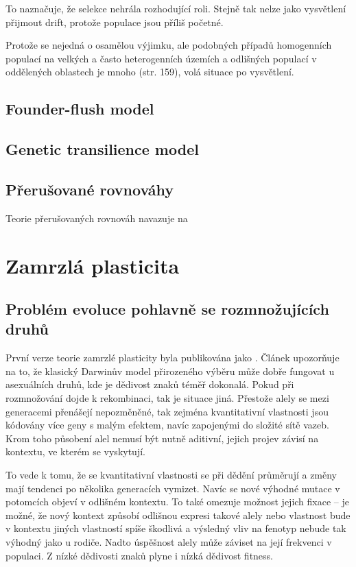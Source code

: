 To naznačuje, že selekce nehrála rozhodující roli. Stejně tak nelze jako vysvětlení přijmout drift, protože populace
jsou příliš početné.

Protože se nejedná o osamělou výjimku, ale podobných případů homogenních populací na velkých a často heterogenních
územích a odlišných populací v oddělených oblastech je mnoho (str. 159), volá situace po vysvětlení.



\subsection{Founder-flush model}

\subsection{Genetic transilience model}

\subsection{Přerušované rovnováhy}

Teorie přerušovaných rovnováh navazuje na

\section{Zamrzlá plasticita}

\subsection{Problém evoluce pohlavně se rozmnožujících druhů}

První verze teorie zamrzlé plasticity byla publikována jako \citet{flegr1998origin}. Článek upozorňuje na to, že
klasický Darwinův model přirozeného výběru může dobře fungovat u asexuálních druhů, kde je dědivost znaků téměř
dokonalá.
Pokud při rozmnožování dojde k rekombinaci, tak je situace jiná. Přestože alely se mezi generacemi přenášejí
nepozměněné, tak zejména kvantitativní vlastnosti jsou kódovány více geny s malým efektem, navíc zapojenými do
složité sítě vazeb. Krom toho působení alel nemusí být nutně aditivní, jejich projev závisí na kontextu,
ve kterém se vyskytují.

To vede k tomu, že se kvantitativní vlastnosti se při dědění průměrují a změny mají tendenci po
několika generacích vymizet. Navíc se nové výhodné mutace v potomcích objeví v odlišném kontextu. To také
omezuje možnost jejich fixace -- je možné, že nový kontext způsobí odlišnou expresi takové alely nebo vlastnost bude
v kontextu jiných vlastností spíše škodlivá a výsledný vliv na fenotyp nebude tak výhodný jako u rodiče. Nadto
úspěšnost alely může záviset na její frekvenci v populaci. Z nízké dědivosti znaků plyne i nízká dědivost fitness.

